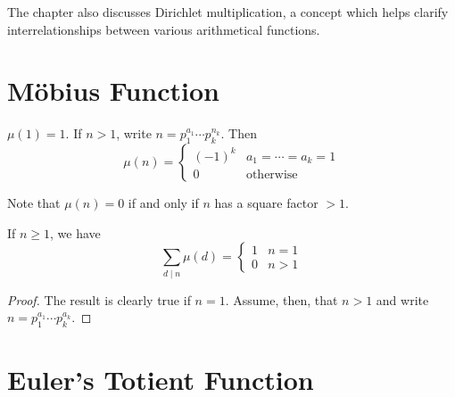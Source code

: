 The chapter also discusses Dirichlet multiplication, a concept which helps clarify interrelationships between various arithmetical functions.

\section{M\"{o}bius Function}
\begin{definition}
$\mu(1)=1$. If $n>1$, write $n=p_1^{a_1}\cdots p_k^{n_k}$. Then
\[\mu(n)=\begin{cases}
(-1)^k&a_1=\cdots=a_k=1\\
0&\text{otherwise}
\end{cases}\]
\end{definition}

\begin{remark}
Note that $\mu(n)=0$ if and only if $n$ has a square factor $>1$.
\end{remark}

\begin{theorem}
If $n\ge1$, we have
\[\sum_{d\mid n}\mu(d)=\begin{cases}
1&n=1\\
0&n>1
\end{cases}\]
\end{theorem}

\begin{proof}
The result is clearly true if $n=1$. Assume, then, that $n>1$ and write $n=p_1^{a_1}\cdots p_k^{a_k}$.
\end{proof}

\section{Euler's Totient Function}
